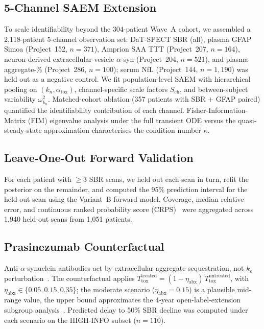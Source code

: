 \subsection*{5-Channel SAEM Extension}

To scale identifiability beyond the 304-patient Wave~A cohort, we assembled a 2{,}118-patient 5-channel observation set: DaT-SPECT SBR (all), plasma GFAP Simoa (Project~152, $n{=}371$), Amprion SAA TTT (Project~207, $n{=}164$), neuron-derived extracellular-vesicle $\alpha$-syn (Project~204, $n{=}521$), and plasma aggregate-\% (Project~286, $n{=}100$); serum NfL (Project~144, $n{=}1{,}190$) was held out as a negative control. We fit population-level SAEM with hierarchical pooling on $(k_n, \alpha_\text{tox})$, channel-specific scale factors $S_\text{ch}$, and between-subject variability $\omega^2_{k_n}$. Matched-cohort ablation (357 patients with SBR + GFAP paired) quantified the identifiability contribution of each channel. Fisher-Information-Matrix (FIM) eigenvalue analysis under the full transient ODE versus the quasi-steady-state approximation characterises the condition number $\kappa$.

\subsection*{Leave-One-Out Forward Validation}

For each patient with $\geq 3$ SBR scans, we held out each scan in turn, refit the posterior on the remainder, and computed the 95\% prediction interval for the held-out scan using the Variant~B forward model. Coverage, median relative error, and continuous ranked probability score (CRPS)~\cite{gneiting2007jasa} were aggregated across 1{,}940 held-out scans from 1{,}051 patients.

\subsection*{Prasinezumab Counterfactual}

Anti-$\alpha$-synuclein antibodies act by extracellular aggregate sequestration, not $k_e$ perturbation~\cite{jankovic2018}. The counterfactual applies $T_\text{tox}^\text{treated} = (1-\eta_\text{abx})\,T_\text{tox}^\text{untreated}$, with $\eta_\text{abx} \in \{0.05, 0.15, 0.35\}$; the moderate scenario ($\eta_\text{abx}=0.15$) is a plausible mid-range value, the upper bound approximates the 4-year open-label-extension subgroup analysis~\cite{pagano2024}. Predicted delay to 50\% SBR decline was computed under each scenario on the HIGH-INFO subset ($n{=}110$).

